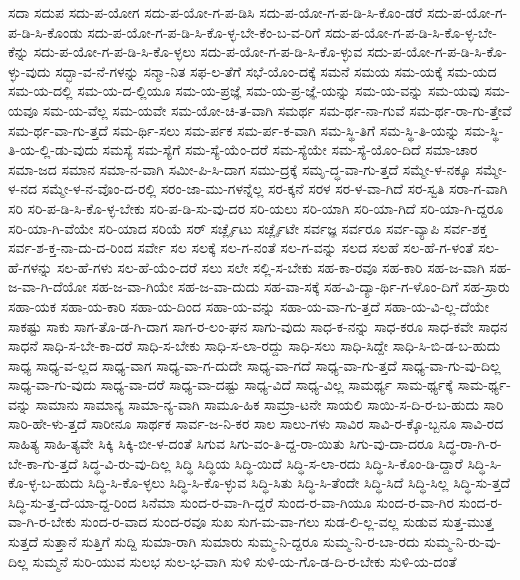 {ಸದಾ
ಸದುಪ
ಸದು-ಪ-ಯೋಗ
ಸದು-ಪ-ಯೋ-ಗ-ಪ-ಡಿಸಿ
ಸದು-ಪ-ಯೋ-ಗ-ಪ-ಡಿ-ಸಿ-ಕೊಂ-ಡರೆ
ಸದು-ಪ-ಯೋ-ಗ-ಪ-ಡಿ-ಸಿ-ಕೊಂಡು
ಸದು-ಪ-ಯೋ-ಗ-ಪ-ಡಿ-ಸಿ-ಕೊ-ಳ್ಳ-ಬೇ-ಕೆಂ-ಬ-ವ-ರಿಗೆ
ಸದು-ಪ-ಯೋ-ಗ-ಪ-ಡಿ-ಸಿ-ಕೊ-ಳ್ಳ-ಬೇ-ಕೆನ್ನು
ಸದು-ಪ-ಯೋ-ಗ-ಪ-ಡಿ-ಸಿ-ಕೊ-ಳ್ಳಲು
ಸದು-ಪ-ಯೋ-ಗ-ಪ-ಡಿ-ಸಿ-ಕೊ-ಳ್ಳುವ
ಸದು-ಪ-ಯೋ-ಗ-ಪ-ಡಿ-ಸಿ-ಕೊ-ಳ್ಳು-ವುದು
ಸದ್ಭಾ-ವ-ನೆ-ಗಳನ್ನು
ಸನ್ಮಾ-ನಿತ
ಸಫ-ಲ-ತೆಗೆ
ಸಭೆ-ಯೊಂ-ದಕ್ಕೆ
ಸಮನೆ
ಸಮಯ
ಸಮ-ಯಕ್ಕೆ
ಸಮ-ಯದ
ಸಮ-ಯ-ದಲ್ಲಿ
ಸಮ-ಯ-ದ-ಲ್ಲಿಯೂ
ಸಮ-ಯ-ಪ್ರಜ್ಞೆ
ಸಮ-ಯ-ಪ್ರ-ಜ್ಞೆ-ಯನ್ನು
ಸಮ-ಯ-ವನ್ನು
ಸಮ-ಯವು
ಸಮ-ಯವೂ
ಸಮ-ಯ-ವೆಲ್ಲ
ಸಮ-ಯವೇ
ಸಮ-ಯೋ-ಚಿ-ತ-ವಾಗಿ
ಸಮರ್ಥ
ಸಮ-ರ್ಥ-ನಾ-ಗುವೆ
ಸಮ-ರ್ಥ-ರಾ-ಗು-ತ್ತೇವೆ
ಸಮ-ರ್ಥ-ವಾ-ಗು-ತ್ತದೆ
ಸಮ-ರ್ಥಿ-ಸಲು
ಸಮ-ರ್ಪಕ
ಸಮ-ರ್ಪ-ಕ-ವಾಗಿ
ಸಮ-ಸ್ಥಿ-ತಿಗೆ
ಸಮ-ಸ್ಥಿ-ತಿ-ಯನ್ನು
ಸಮ-ಸ್ಥಿ-ತಿ-ಯ-ಲ್ಲಿ-ಡು-ವುದು
ಸಮಸ್ಯೆ
ಸಮ-ಸ್ಯೆಗೆ
ಸಮ-ಸ್ಯೆ-ಯೆಂ-ದರೆ
ಸಮ-ಸ್ಯೆಯೇ
ಸಮ-ಸ್ಯೆ-ಯೊಂ-ದಿದೆ
ಸಮಾ-ಚಾರ
ಸಮಾ-ಜದ
ಸಮಾನ
ಸಮಾ-ನ-ವಾಗಿ
ಸಮೀ-ಪಿ-ಸಿ-ದಾಗ
ಸಮು-ದ್ರಕ್ಕೆ
ಸಮೃ-ದ್ಧ-ವಾ-ಗು-ತ್ತದೆ
ಸಮ್ಮೇ-ಳ-ನಕ್ಕೂ
ಸಮ್ಮೇ-ಳ-ನದ
ಸಮ್ಮೇ-ಳ-ನ-ವೊಂ-ದ-ರಲ್ಲಿ
ಸರಂ-ಜಾ-ಮು-ಗಳನ್ನೆಲ್ಲ
ಸರ-ಕ್ಕನೆ
ಸರಳ
ಸರ-ಳ-ವಾ-ಗಿದೆ
ಸರ-ಸ್ವತಿ
ಸರಾ-ಗ-ವಾಗಿ
ಸರಿ
ಸರಿ-ಪ-ಡಿ-ಸಿ-ಕೊ-ಳ್ಳ-ಬೇಕು
ಸರಿ-ಪ-ಡಿ-ಸು-ವು-ದರ
ಸರಿ-ಯಲು
ಸರಿ-ಯಾಗಿ
ಸರಿ-ಯಾ-ಗಿದೆ
ಸರಿ-ಯಾ-ಗಿ-ದ್ದರೂ
ಸರಿ-ಯಾ-ಗಿ-ವೆಯೇ
ಸರಿ-ಯಾದ
ಸರಿಯೆ
ಸರ್
ಸರ್ಚ್ಲೈಟು
ಸರ್ಚ್ಲೈಟೇ
ಸರ್ವಜ್ಞ
ಸರ್ವರೂ
ಸರ್ವ-ವ್ಯಾಪಿ
ಸರ್ವ-ಶಕ್ತ
ಸರ್ವ-ಶ-ಕ್ತ-ನಾ-ದು-ದ-ರಿಂದ
ಸರ್ವೇ
ಸಲ
ಸಲಕ್ಕೆ
ಸಲ-ಗ-ನಂತೆ
ಸಲ-ಗ-ವನ್ನು
ಸಲದ
ಸಲಹೆ
ಸಲ-ಹೆ-ಗ-ಳಂತೆ
ಸಲ-ಹೆ-ಗಳನ್ನು
ಸಲ-ಹೆ-ಗಳು
ಸಲ-ಹೆ-ಯೆಂ-ದರೆ
ಸಲು
ಸಲೇ
ಸಲ್ಲಿ-ಸ-ಬೇಕು
ಸಹ-ಕಾ-ರವೂ
ಸಹ-ಕಾರಿ
ಸಹ-ಜ-ವಾಗಿ
ಸಹ-ಜ-ವಾ-ಗಿ-ದೆಯೋ
ಸಹ-ಜ-ವಾ-ಗಿಯೇ
ಸಹ-ಜ-ವಾ-ದುದು
ಸಹ-ವಾ-ಸಕ್ಕೆ
ಸಹ-ವಿ-ದ್ಯಾ-ರ್ಥಿ-ಗ-ಳೊಂ-ದಿಗೆ
ಸಹ-ಸ್ರಾರು
ಸಹಾ-ಯಕ
ಸಹಾ-ಯ-ಕಾರಿ
ಸಹಾ-ಯ-ದಿಂದ
ಸಹಾ-ಯ-ವನ್ನು
ಸಹಾ-ಯ-ವಾ-ಗು-ತ್ತದೆ
ಸಹಾ-ಯ-ವಿ-ಲ್ಲ-ದೆಯೇ
ಸಾಕಷ್ಟು
ಸಾಕು
ಸಾಗ-ತೊ-ಡ-ಗಿ-ದಾಗ
ಸಾಗ-ರ-ಲಂ-ಘನ
ಸಾಗು-ವುದು
ಸಾಧ-ಕ-ನನ್ನು
ಸಾಧ-ಕರೂ
ಸಾಧ-ಕವೇ
ಸಾಧನ
ಸಾಧನೆ
ಸಾಧಿ-ಸ-ಬೇ-ಕಾ-ದರೆ
ಸಾಧಿ-ಸ-ಬೇಕು
ಸಾಧಿ-ಸ-ಲಾ-ರದ್ದು
ಸಾಧಿ-ಸಲು
ಸಾಧಿ-ಸಿದ್ದೇ
ಸಾಧಿ-ಸಿ-ಬಿ-ಡ-ಬ-ಹುದು
ಸಾಧ್ಯ
ಸಾಧ್ಯ-ವ-ಲ್ಲದ
ಸಾಧ್ಯ-ವಾಗ
ಸಾಧ್ಯ-ವಾ-ಗ-ದುದೇ
ಸಾಧ್ಯ-ವಾ-ಗದೆ
ಸಾಧ್ಯ-ವಾ-ಗು-ತ್ತದೆ
ಸಾಧ್ಯ-ವಾ-ಗು-ವು-ದಿಲ್ಲ
ಸಾಧ್ಯ-ವಾ-ಗು-ವುದು
ಸಾಧ್ಯ-ವಾ-ದರೆ
ಸಾಧ್ಯ-ವಾ-ದಷ್ಟು
ಸಾಧ್ಯ-ವಿದೆ
ಸಾಧ್ಯ-ವಿಲ್ಲ
ಸಾಮರ್ಥ್ಯ
ಸಾಮ-ರ್ಥ್ಯಕ್ಕೆ
ಸಾಮ-ರ್ಥ್ಯ-ವನ್ನು
ಸಾಮಾನು
ಸಾಮಾನ್ಯ
ಸಾಮಾ-ನ್ಯ-ವಾಗಿ
ಸಾಮೂ-ಹಿಕ
ಸಾಮ್ರಾ-ಟನೇ
ಸಾಯಲಿ
ಸಾಯಿ-ಸ-ದಿ-ರ-ಬ-ಹುದು
ಸಾರಿ
ಸಾರಿ-ಹೇ-ಳು-ತ್ತದೆ
ಸಾರೀನೂ
ಸಾರ್ಥಕ
ಸಾರ್ವ-ಜ-ನಿ-ಕರ
ಸಾಲ
ಸಾಲು-ಗಳು
ಸಾವಿರ
ಸಾವಿ-ರ-ಕ್ಕೊ-ಬ್ಬನೂ
ಸಾವಿ-ರದ
ಸಾಹಿತ್ಯ
ಸಾಹಿ-ತ್ಯವೇ
ಸಿಕ್ಕಿ
ಸಿಕ್ಕಿ-ಬೀ-ಳ-ದಂತೆ
ಸಿಗುವ
ಸಿಗು-ವಂ-ತಿ-ದ್ದ-ರಾ-ಯಿತು
ಸಿಗು-ವು-ದಾ-ದರೂ
ಸಿದ್ಧ-ರಾ-ಗಿ-ರ-ಬೇ-ಕಾ-ಗು-ತ್ತದೆ
ಸಿದ್ಧ-ವಿ-ರು-ವು-ದಿಲ್ಲ
ಸಿದ್ಧಿ
ಸಿದ್ಧಿಯ
ಸಿದ್ಧಿ-ಯಿದೆ
ಸಿದ್ಧಿ-ಸ-ಲಾ-ರದು
ಸಿದ್ಧಿ-ಸಿ-ಕೊಂ-ಡಿ-ದ್ದಾರೆ
ಸಿದ್ಧಿ-ಸಿ-ಕೊ-ಳ್ಳ-ಬ-ಹುದು
ಸಿದ್ಧಿ-ಸಿ-ಕೊ-ಳ್ಳಲು
ಸಿದ್ಧಿ-ಸಿ-ಕೊ-ಳ್ಳುವ
ಸಿದ್ಧಿ-ಸಿತು
ಸಿದ್ಧಿ-ಸಿ-ತೆಂದೇ
ಸಿದ್ಧಿ-ಸಿದೆ
ಸಿದ್ಧಿ-ಸಿಲ್ಲ
ಸಿದ್ಧಿ-ಸು-ತ್ತದೆ
ಸಿದ್ಧಿ-ಸು-ತ್ತ-ದೆ-ಯಾ-ದ್ದ-ರಿಂದ
ಸಿನೆಮಾ
ಸುಂದ-ರ-ವಾ-ಗಿ-ದ್ದರೆ
ಸುಂದ-ರ-ವಾ-ಗಿಯೂ
ಸುಂದ-ರ-ವಾ-ಗಿರ
ಸುಂದ-ರ-ವಾ-ಗಿ-ರ-ಬೇಕು
ಸುಂದ-ರ-ವಾದ
ಸುಂದ-ರವೂ
ಸುಖ
ಸುಗ-ಮ-ವಾ-ಗಲು
ಸುಡ-ಲಿ-ಲ್ಲ-ವಲ್ಲ
ಸುಡುವ
ಸುತ್ತ-ಮುತ್ತ
ಸುತ್ತದೆ
ಸುತ್ತಾನೆ
ಸುತ್ತಿಗೆ
ಸುದ್ದಿ
ಸುಮಾ-ರಾಗಿ
ಸುಮಾರು
ಸುಮ್ಮ-ನಿ-ದ್ದರೂ
ಸುಮ್ಮ-ನಿ-ರ-ಬಾ-ರದು
ಸುಮ್ಮ-ನಿ-ರು-ವು-ದಿಲ್ಲ
ಸುಮ್ಮನೆ
ಸುರಿ-ಯುವ
ಸುಲಭ
ಸುಲ-ಭ-ವಾಗಿ
ಸುಳಿ
ಸುಳಿ-ಯ-ಗೊ-ಡ-ದಿ-ರ-ಬೇಕು
ಸುಳಿ-ಯ-ದಂತೆ
}
